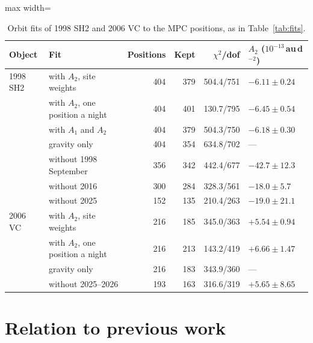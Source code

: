 \documentclass[3p,11pt]{elsarticle}
\begin{document}
\begin{table}[t]
\centering\small
\caption{Orbit fits of 1998 SH2 and 2006 VC to the MPC positions, as in
Table~\ref{tab:fits}.}
\label{tab:others}
\begin{adjustbox}{max width=\textwidth}
\begin{tabular}{llrrrl}
\toprule
Object & Fit & Positions & Kept & $\chi^2$/dof & $A_2$ ($10^{-13}$\,au\,d$^{-2}$) \\
\midrule
1998 SH2 & with $A_2$, site weights & 404 & 379 & 504.4/751 & $-6.11\pm0.24$ \\
 & with $A_2$, one position a night & 404 & 401 & 130.7/795 & $-6.45\pm0.54$ \\
 & with $A_1$ and $A_2$ & 404 & 379 & 504.3/750 & $-6.18\pm0.30$ \\
 & gravity only & 404 & 354 & 634.8/702 & --- \\
 & without 1998 September & 356 & 342 & 442.4/677 & $-42.7\pm12.3$ \\
 & without 2016 & 300 & 284 & 328.3/561 & $-18.0\pm5.7$ \\
 & without 2025 & 152 & 135 & 210.4/263 & $-19.0\pm21.1$ \\
2006 VC & with $A_2$, site weights & 216 & 185 & 345.0/363 & $+5.54\pm0.94$ \\
 & with $A_2$, one position a night & 216 & 213 & 143.2/419 & $+6.66\pm1.47$ \\
 & gravity only & 216 & 183 & 343.9/360 & --- \\
 & without 2025--2026 & 193 & 163 & 316.6/319 & $+5.65\pm8.65$ \\
\bottomrule
\end{tabular}
\end{adjustbox}
\end{table}

\section{Relation to previous work}\label{sec:related}
\end{document}
